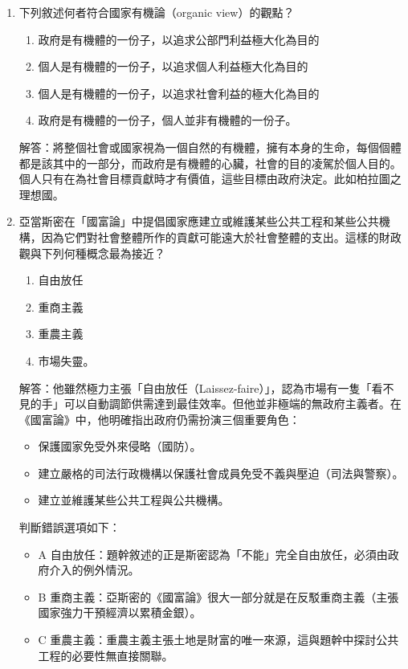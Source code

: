\documentclass[12pt, a4paper]{article}
\begin{document}
\begin{enumerate}
    \item 下列敘述何者符合國家有機論（organic view）的觀點？
        \begin{enumerate}[label=\Alph*.]
            \item 政府是有機體的一份子，以追求公部門利益極大化為目的
            \item 個人是有機體的一份子，以追求個人利益極大化為目的
            \item 個人是有機體的一份子，以追求社會利益的極大化為目的
            \item 政府是有機體的一份子，個人並非有機體的一份子。
        \end{enumerate}
        解答：將整個社會或國家視為一個自然的有機體，擁有本身的生命，每個個體都是該其中的一部分，而政府是有機體的心臟，社會的目的凌駕於個人目的。個人只有在為社會目標貢獻時才有價值，這些目標由政府決定。此如柏拉圖之理想國。

    \newpage

    \item 亞當斯密在「國富論」中提倡國家應建立或維護某些公共工程和某些公共機構，因為它們對社會整體所作的貢獻可能遠大於社會整體的支出。這樣的財政觀與下列何種概念最為接近？
        \begin{enumerate}[label=\Alph*.]
            \item 自由放任
            \item 重商主義
            \item 重農主義
            \item 市場失靈。
        \end{enumerate}
        解答：他雖然極力主張「自由放任（Laissez-faire）」，認為市場有一隻「看不見的手」可以自動調節供需達到最佳效率。但他並非極端的無政府主義者。在《國富論》中，他明確指出政府仍需扮演三個重要角色：
        \begin{itemize}
            \item 保護國家免受外來侵略（國防）。
            \item 建立嚴格的司法行政機構以保護社會成員免受不義與壓迫（司法與警察）。
            \item 建立並維護某些公共工程與公共機構。
        \end{itemize}
        判斷錯誤選項如下：
        \begin{itemize}
            \item A 自由放任：題幹敘述的正是斯密認為「不能」完全自由放任，必須由政府介入的例外情況。
            \item B 重商主義：亞斯密的《國富論》很大一部分就是在反駁重商主義（主張國家強力干預經濟以累積金銀）。
            \item C 重農主義：重農主義主張土地是財富的唯一來源，這與題幹中探討公共工程的必要性無直接關聯。
        \end{itemize}


\end{enumerate}
\end{document}
